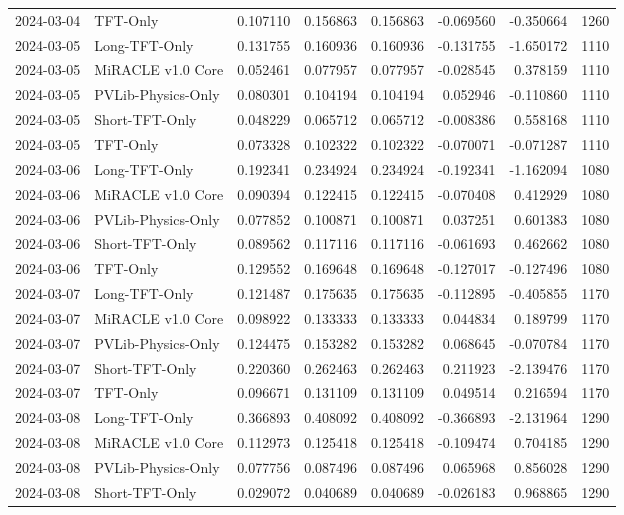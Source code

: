 \begin{tabular}{llrrrrrr}
2024-03-04 & TFT-Only & 0.107110 & 0.156863 & 0.156863 & -0.069560 & -0.350664 & 1260 \\
2024-03-05 & Long-TFT-Only & 0.131755 & 0.160936 & 0.160936 & -0.131755 & -1.650172 & 1110 \\
2024-03-05 & MiRACLE v1.0 Core & 0.052461 & 0.077957 & 0.077957 & -0.028545 & 0.378159 & 1110 \\
2024-03-05 & PVLib-Physics-Only & 0.080301 & 0.104194 & 0.104194 & 0.052946 & -0.110860 & 1110 \\
2024-03-05 & Short-TFT-Only & 0.048229 & 0.065712 & 0.065712 & -0.008386 & 0.558168 & 1110 \\
2024-03-05 & TFT-Only & 0.073328 & 0.102322 & 0.102322 & -0.070071 & -0.071287 & 1110 \\
2024-03-06 & Long-TFT-Only & 0.192341 & 0.234924 & 0.234924 & -0.192341 & -1.162094 & 1080 \\
2024-03-06 & MiRACLE v1.0 Core & 0.090394 & 0.122415 & 0.122415 & -0.070408 & 0.412929 & 1080 \\
2024-03-06 & PVLib-Physics-Only & 0.077852 & 0.100871 & 0.100871 & 0.037251 & 0.601383 & 1080 \\
2024-03-06 & Short-TFT-Only & 0.089562 & 0.117116 & 0.117116 & -0.061693 & 0.462662 & 1080 \\
2024-03-06 & TFT-Only & 0.129552 & 0.169648 & 0.169648 & -0.127017 & -0.127496 & 1080 \\
2024-03-07 & Long-TFT-Only & 0.121487 & 0.175635 & 0.175635 & -0.112895 & -0.405855 & 1170 \\
2024-03-07 & MiRACLE v1.0 Core & 0.098922 & 0.133333 & 0.133333 & 0.044834 & 0.189799 & 1170 \\
2024-03-07 & PVLib-Physics-Only & 0.124475 & 0.153282 & 0.153282 & 0.068645 & -0.070784 & 1170 \\
2024-03-07 & Short-TFT-Only & 0.220360 & 0.262463 & 0.262463 & 0.211923 & -2.139476 & 1170 \\
2024-03-07 & TFT-Only & 0.096671 & 0.131109 & 0.131109 & 0.049514 & 0.216594 & 1170 \\
2024-03-08 & Long-TFT-Only & 0.366893 & 0.408092 & 0.408092 & -0.366893 & -2.131964 & 1290 \\
2024-03-08 & MiRACLE v1.0 Core & 0.112973 & 0.125418 & 0.125418 & -0.109474 & 0.704185 & 1290 \\
2024-03-08 & PVLib-Physics-Only & 0.077756 & 0.087496 & 0.087496 & 0.065968 & 0.856028 & 1290 \\
2024-03-08 & Short-TFT-Only & 0.029072 & 0.040689 & 0.040689 & -0.026183 & 0.968865 & 1290 \\

\end{tabular}

